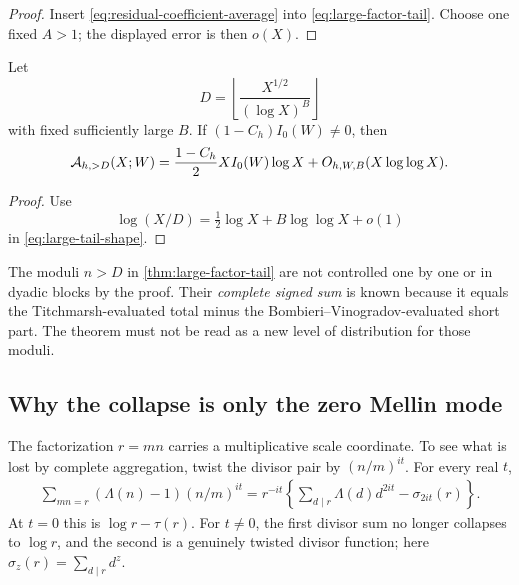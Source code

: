 \begin{proof}
Insert \eqref{eq:residual-coefficient-average} into
\eqref{eq:large-factor-tail}.  Choose one fixed $A>1$; the displayed
error is then $o(X)$.
\end{proof}

\begin{corollary}
\label{cor:half-leading-mass}
Let
\begin{equation}\label{eq:square-root-D}
 D=\left\lfloor\frac{X^{1/2}}{(\log X)^B}\right\rfloor
\end{equation}
with fixed sufficiently large $B$.  If $(1-C_h)I_0(W)\ne0$, then
\begin{equation}\label{eq:half-leading-mass}
 \mathcal A_{h,>D}(X;W)
 =\frac{1-C_h}{2}XI_0(W)\log X
 +O_{h,W,B}(X\log\log X).
\end{equation}
\end{corollary}

\begin{proof}
Use
\[
 \log(X/D)=\tfrac12\log X+B\log\log X+o(1)
\]
in \eqref{eq:large-tail-shape}.
\end{proof}

\begin{remark}
The moduli $n>D$ in \cref{thm:large-factor-tail} are not controlled one by
one or in dyadic blocks by the proof.  Their \emph{complete signed sum} is
known because it equals the Titchmarsh-evaluated total minus the
Bombieri--Vinogradov-evaluated short part.  The theorem must not be read as a
new level of distribution for those moduli.
\end{remark}

\subsection{Why the collapse is only the zero Mellin mode}
\label{subsec:nonzero-Mellin}

The factorization $r=mn$ carries a multiplicative scale coordinate.  To see
what is lost by complete aggregation, twist the divisor pair by
$(n/m)^{it}$.  For every real $t$,
\begin{align}
 \sum_{mn=r}(\Lambda(n)-1)(n/m)^{it}
 =r^{-it}\left\{
   \sum_{d\mid r}\Lambda(d)d^{2it}-\sigma_{2it}(r)
 \right\}.
 \label{eq:Mellin-twisted-divisor-sum}
\end{align}
At $t=0$ this is $\log r-\tau(r)$.  For $t\ne0$, the first divisor sum no
longer collapses to $\log r$, and the second is a genuinely twisted divisor
function; here $\sigma_z(r)=\sum_{d\mid r}d^z$.

